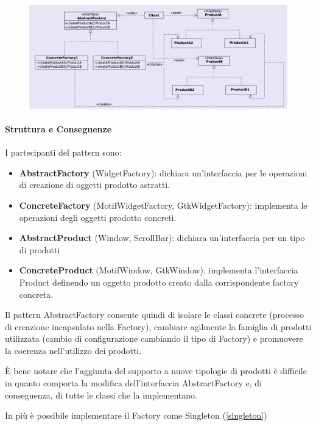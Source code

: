 \begin{figure}[H]
    \centering
    \includegraphics[width=1\linewidth]{assets/pattern/abstract-factory/abstract-factory-struttura.png}
\end{figure}

\paragraph{Struttura e Conseguenze} I partecipanti del pattern sono:
\begin{itemize}
    \item \textbf{AbstractFactory} (WidgetFactory): dichiara un’interfaccia per le operazioni di creazione di oggetti prodotto astratti.
    \item \textbf{ConcreteFactory} (MotifWidgetFactory, GtkWidgetFactory): implementa le operazioni degli oggetti prodotto concreti. 
    \item \textbf{AbstractProduct} (Window, ScrollBar): dichiara un’interfaccia per un tipo di prodotti
    \item \textbf{ConcreteProduct} (MotifWindow, GtkWindow): implementa l’interfaccia Product definendo un oggetto prodotto creato dalla corrispondente factory concreta.
\end{itemize}

Il pattern AbstractFactory consente quindi di isolare le classi concrete (processo di creazione incapsulato nella Factory), cambiare agilmente la famiglia di prodotti utilizzata (cambio di configurazione cambiando il tipo di Factory) e promuovere la coerenza nell'utilizzo dei prodotti.

È bene notare che l'aggiunta del supporto a nuove tipologie di prodotti è difficile in quanto comporta la modifica dell'interfaccia AbstractFactory e, di conseguenza, di tutte le classi che la implementano.

In più è possibile implementare il Factory come Singleton (\ref{singleton})

